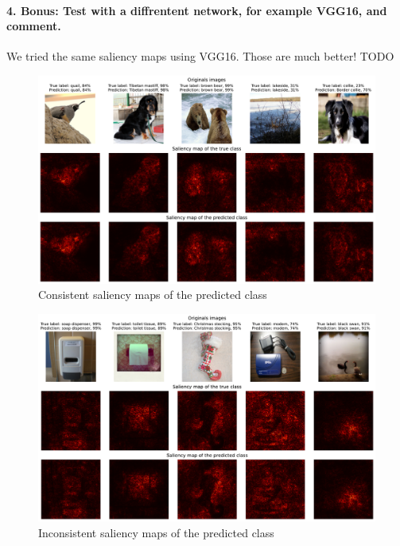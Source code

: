 
\paragraph*{4. \textbf{Bonus:} Test with a diffrentent network, for example VGG16, and comment.}
We tried the same saliency maps using VGG16. Those are much better! TODO

\begin{figure}[H]
    \centering
    \includegraphics[width=.9\textwidth]{good_saliency_map_vgg16.pdf}
    \caption{Consistent saliency maps of the predicted class}
    \label{fig:good_saliency_map_vgg16}
\end{figure}

\begin{figure}[H]
    \centering  
    \includegraphics[width=.9\textwidth]{bad_saliency_map_vgg16.pdf}
    \caption{Inconsistent saliency maps of the predicted class}
    \label{fig:bad_saliency_map_vgg16}
\end{figure}


